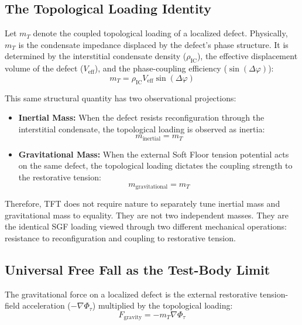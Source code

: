 \subsection{The Topological Loading Identity}

Let $m_T$ denote the coupled topological loading of a localized defect. Physically, $m_T$ is the condensate impedance displaced by the defect's phase structure. It is determined by the interstitial condensate density ($\rho_{\mathrm{IC}}$), the effective displacement volume of the defect ($V_{\mathrm{eff}}$), and the phase-coupling efficiency ($\sin(\Delta\varphi)$):
\begin{equation}
    m_T = \rho_{\mathrm{IC}} V_{\mathrm{eff}} \sin(\Delta\varphi)
\end{equation}

This same structural quantity has two observational projections:

\begin{itemize}
    \item \textbf{Inertial Mass:} When the defect resists reconfiguration through the interstitial condensate, the topological loading is observed as inertia:
    \begin{equation}
        m_{\mathrm{inertial}} = m_T
    \end{equation}
    
    \item \textbf{Gravitational Mass:} When the external Soft Floor tension potential acts on the same defect, the topological loading dictates the coupling strength to the restorative tension:
    \begin{equation}
        m_{\mathrm{gravitational}} = m_T
    \end{equation}
\end{itemize}

Therefore, TFT does not require nature to separately tune inertial mass and gravitational mass to equality. They are not two independent masses. They are the identical SGF loading viewed through two different mechanical operations: resistance to reconfiguration and coupling to restorative tension.

\subsection{Universal Free Fall as the Test-Body Limit}

The gravitational force on a localized defect is the external restorative tension-field acceleration ($-\nabla\Phi_\tau$) multiplied by the topological loading:
\begin{equation}
    F_{\mathrm{gravity}} = -m_T \nabla\Phi_\tau
\end{equation}

